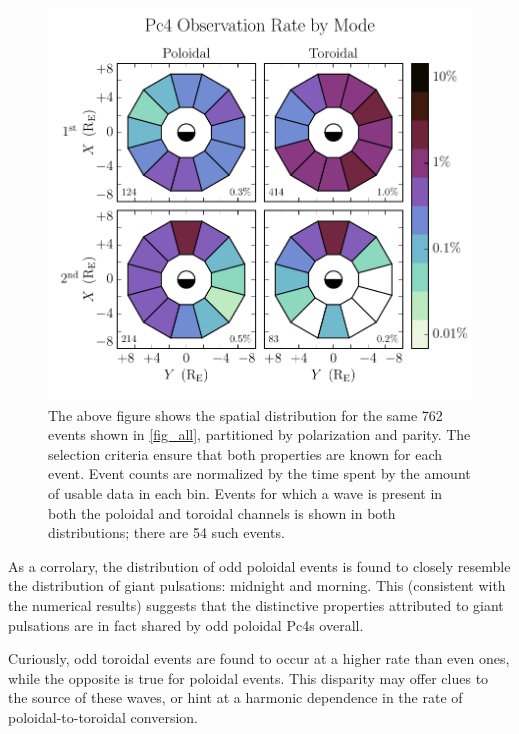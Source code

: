 \documentclass[draft,linenumbers]{agujournal}
\begin{document}
\begin{figure}
    \begin{center}
    \includegraphics[width=\textwidth]{figures/fig_mode.pdf}
    \caption{
        The above figure shows the spatial distribution for the same 762 events shown in \cref{fig_all}, partitioned by polarization and parity. The selection criteria ensure that both properties are known for each event. Event counts are normalized by the time spent by the amount of usable data in each bin. Events for which a wave is present in both the poloidal and toroidal channels is shown in both distributions; there are 54 such events.
    }
    \label{fig_mode}
    \end{center}
\end{figure}

As a corrolary, the distribution of odd poloidal events is found to closely resemble the distribution of giant pulsations: midnight and morning. This (consistent with the numerical results) suggests that the distinctive properties attributed to giant pulsations are in fact shared by odd poloidal Pc4s overall.

Curiously, odd toroidal events are found to occur at a higher rate than even ones, while the opposite is true for poloidal events. This disparity may offer clues to the source of these waves, or hint at a harmonic dependence in the rate of poloidal-to-toroidal conversion.
\end{document}
